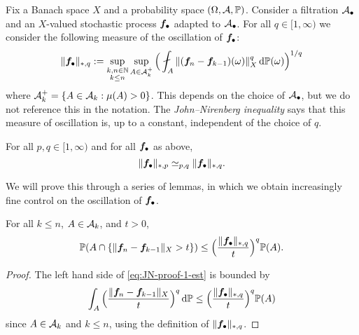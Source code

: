 Fix a Banach space $X$ and a probability space $(\Omega,\mathcal{A},\mathbb{P})$.
Consider a filtration $\mathcal{A}_{\bullet}$ and an $X$-valued stochastic process $\bm{f}_{\bullet}$ adapted to $\mathcal{A}_{\bullet}$.
For all $q \in [1,\infty)$ we consider the following measure of the oscillation of $\bm{f}_{\bullet}$:
\begin{equation*}
  \|\mb{f}_{\bullet}\|_{*,q} := \sup_{\substack{k,n \in \N \\ k \leq n}} \sup_{A \in \mc{A}_k^{+}} \Big( \fint_{A} \|(\mb{f}_n - \mb{f}_{k-1})(\omega)\|_{X}^{q} \, \dd\P(\omega)\Big)^{1/q}
\end{equation*}
where $\mathcal{A}_{k}^{+} = \{A \in \mathcal{A}_{k} : \mu(A) > 0\}$.
This depends on the choice of $\mathcal{A}_{\bullet}$, but we do not reference this in the notation.
The \emph{John--Nirenberg inequality} says that this measure of oscillation is, up to a constant, independent of the choice of $q$.

\begin{thm}\label{thm:jn-adapted-sequences}
  For all $p,q \in [1,\infty)$ and for all $\bm{f}_{\bullet}$ as above,
  \begin{equation*}
    \|\bm{f}_{\bullet}\|_{*,p} \simeq_{p,q} \|\bm{f}_{\bullet}\|_{*,q}.
  \end{equation*}
\end{thm}

We will prove this through a series of lemmas, in which we obtain increasingly fine control on the oscillation of $\bm{f}_{\bullet}$.

\begin{lem}\label{lem:JN-proof-1}
  For all $k \leq n$, $A \in \mathcal{A}_k$, and $t > 0$,
  \begin{equation}\label{eq:JN-proof-1-est}
    \mathbb{P}(A \cap \{ \|\bm{f}_n - \bm{f}_{k-1}\|_{X} > t \}) \leq \Big( \frac{\|\bm{f}_{\bullet}\|_{*,q}}{t} \Big)^{q} \mathbb{P}(A).
  \end{equation}
\end{lem}

\begin{proof}
  The left hand side of \eqref{eq:JN-proof-1-est} is bounded by
  \begin{equation*}
    \int_{A} \Big( \frac{\|\bm{f}_n - \bm{f}_{k-1}\|_{X}}{t} \Big)^{q} \, \mathrm{d}\mathbb{P} \leq \Big( \frac{\|\bm{f}_{\bullet}\|_{*,q}}{t} \Big)^{q} \mathbb{P}(A) 
  \end{equation*}
  since $A \in \mathcal{A}_k$ and $k \leq n$, using the definition of $\|\bm{f}_{\bullet}\|_{*,q}$.
\end{proof}

